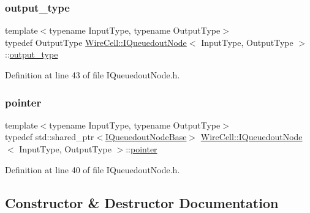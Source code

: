 \mbox{\label{class_wire_cell_1_1_i_queuedout_node_a73c4920dd90460bd4f0ef9beb61d6091}} 
\subsubsection{\texorpdfstring{output\+\_\+type}{output\_type}}
{\footnotesize\ttfamily template$<$typename Input\+Type, typename Output\+Type$>$ \\
typedef Output\+Type \hyperlink{class_wire_cell_1_1_i_queuedout_node}{Wire\+Cell\+::\+I\+Queuedout\+Node}$<$ Input\+Type, Output\+Type $>$\+::\hyperlink{class_wire_cell_1_1_i_queuedout_node_a73c4920dd90460bd4f0ef9beb61d6091}{output\+\_\+type}}



Definition at line 43 of file I\+Queuedout\+Node.\+h.

\mbox{\label{class_wire_cell_1_1_i_queuedout_node_aa286ccabc249c4b3c41be71862bbe024}} 
\subsubsection{\texorpdfstring{pointer}{pointer}}
{\footnotesize\ttfamily template$<$typename Input\+Type, typename Output\+Type$>$ \\
typedef std\+::shared\+\_\+ptr$<$\hyperlink{class_wire_cell_1_1_i_queuedout_node_base}{I\+Queuedout\+Node\+Base}$>$ \hyperlink{class_wire_cell_1_1_i_queuedout_node}{Wire\+Cell\+::\+I\+Queuedout\+Node}$<$ Input\+Type, Output\+Type $>$\+::\hyperlink{class_wire_cell_1_1_interface_a09c548fb8266cfa39afb2e74a4615c37}{pointer}}



Definition at line 40 of file I\+Queuedout\+Node.\+h.



\subsection{Constructor \& Destructor Documentation}
\mbox{\label{class_wire_cell_1_1_i_queuedout_node_a108a312ac858f484c69a614974fbd70a}} 
